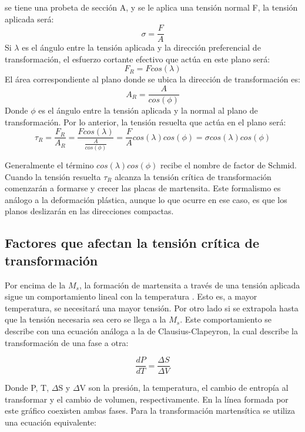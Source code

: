 \documentclass[a4paper,12pt,fleqn,twoside,openany]{book}
\begin{document}
 se tiene una probeta de 
sección A, y se le aplica una tensión normal F, la tensión aplicada será:
\begin{equation}
 \sigma = \frac{F}{A}
\end{equation}
Si $\lambda$ es el ángulo entre la tensión aplicada y la dirección preferencial de transformación, el esfuerzo cortante efectivo que actúa en este plano será:
\begin{equation}
 F_{R}= F cos(\lambda)
\end{equation}
El área correspondiente al plano donde se ubica la dirección de transformación es:
\begin{equation}
 A_{R}=\frac{A}{cos(\phi)}
\end{equation}
Donde $\phi$ es el ángulo entre la tensión aplicada y la normal al plano de transformación. Por lo anterior, la tensión resuelta que actúa en el plano será:
\begin{equation}
 \tau_{R}=\frac{F_{R}}{A_{R}}= \frac{Fcos(\lambda) }{\frac{A}{cos(\phi)}}=\frac{F}{A} cos(\lambda)cos(\phi) = \sigma cos(\lambda)cos(\phi)
\end{equation}

Generalmente el término $cos(\lambda)cos(\phi)$ recibe el nombre de factor de Schmid. Cuando la tensión resuelta $\tau_R$ alcanza la tensión crítica de transformación comenzarán a formarse y crecer las placas de martensita. Este formalismo es análogo a la deformación plástica, aunque lo que ocurre en ese caso, es que los planos deslizarán en las direcciones compactas.


\subsection{Factores que afectan la tensión crítica de transformación}


Por encima de la $M_s$, la formación de martensita a través de una tensión aplicada sigue un comportamiento lineal con la temperatura \cite{pierre}. Esto es, a mayor temperatura, se 
necesitará una mayor tensión. Por otro lado si se extrapola hasta que la tensión necesaria sea cero se llega a la $M_s$. Este comportamiento se describe con una ecuación 
análoga a la de Clausius-Clapeyron, la cual describe la transformación de una fase a otra:

\begin{equation}
 \frac{dP}{dT}=\frac{\Delta S}{\Delta V}
\end{equation}

Donde P, T, $\Delta$S y $\Delta$V son la presión, la temperatura, el cambio de entropía al transformar y el cambio de volumen, respectivamente. En la línea formada por este gráfico 
coexisten ambas fases. Para la transformación martensítica se utiliza una ecuación equivalente:
\end{document}

